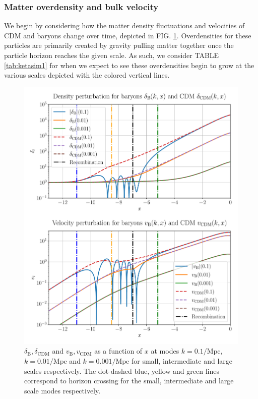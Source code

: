 \documentclass[%
reprint,
 amsmath,amssymb,
 aps,
]{revtex4-2}
\begin{document}
\subsubsection{Matter overdensity and bulk velocity}
We begin by considering how the matter density fluctuations and velocities of CDM and baryons change over time, depicted in FIG. \ref{fig:b_cdm}. Overdensities for these particles are primarily created by gravity pulling matter together once the particle horizon reaches the given scale. As such, we consider TABLE \ref{tab:ketasim1} for when we expect to see these overdensities begin to grow at the various scales depicted with the colored vertical lines.
\begin{figure}[ht!]
	\includegraphics[width = \linewidth]{Figures/baryon_cdm.pdf}
	\caption{$\delta_\text{B}, \delta_\text{CDM}$ and $v_\text{B},v_\text{CDM}$ as a function of $x$ at modes $k=0.1/\text{Mpc}$, $k=0.01/\text{Mpc}$ and $k=0.001/\text{Mpc}$ for small, intermediate and large scales respectively. The dot-dashed blue, yellow and green lines correspond to horizon crossing for the small, intermediate and large scale modes respectively.}
	\label{fig:b_cdm}
\end{figure}
\end{document}
